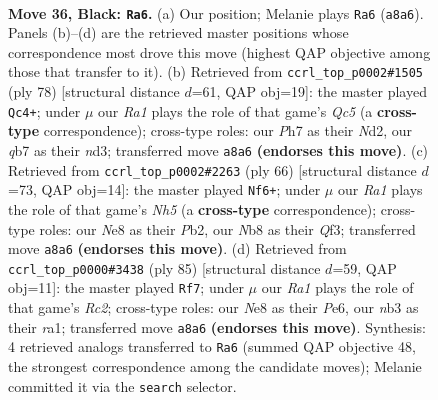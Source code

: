 \documentclass[11pt]{article}
\begin{document}
\clearpage

\begin{figure}[p]\centering
\begin{subfigure}{0.46\textwidth}\centering
\resizebox{\linewidth}{!}{%
\newchessgame
\chessboard[
  setfen={rn2nk2/1Q5p/7p/p1P2p1P/P4q2/1N6/6K1/RN6 b - - 5 36},
  showmover=false,
  pgfstyle=straightmove, color=movearrow, markmove={a8-a6}
]}
\caption{}
\end{subfigure}\hfill
\begin{subfigure}{0.46\textwidth}\centering
\resizebox{\linewidth}{!}{%
\newchessgame
\chessboard[
  setfen={3r1nk1/1q4p1/7p/2Q1p3/R3P3/3nP1PP/3N3N/6K1 w - - 0 40},
  showmover=false,
  pgfstyle=straightmove, color=movearrow, markmove={c5-c4}
]}
\caption{}
\end{subfigure}
\\[4pt]
\begin{subfigure}{0.46\textwidth}\centering
\resizebox{\linewidth}{!}{%
\newchessgame
\chessboard[
  setfen={2r3k1/4rp2/p2p2np/6qN/8/3P1Q1R/1P4PP/R6K w - - 4 34},
  showmover=false,
  pgfstyle=straightmove, color=movearrow, markmove={h5-f6}
]}
\caption{}
\end{subfigure}\hfill
\begin{subfigure}{0.46\textwidth}\centering
\resizebox{\linewidth}{!}{%
\newchessgame
\chessboard[
  setfen={8/2r3k1/4p1pp/Pqn1P3/6P1/4Q3/7P/R2N2K1 b - - 1 43},
  showmover=false,
  pgfstyle=straightmove, color=movearrow, markmove={c7-f7}
]}
\caption{}
\end{subfigure}
\caption{\textbf{Move 36, Black: \texttt{Ra6}.} (a) Our position; Melanie plays \texttt{Ra6} (\texttt{a8a6}). Panels (b)--(d) are the retrieved master positions whose correspondence most drove this move (highest QAP objective among those that transfer to it). (b) Retrieved from \texttt{ccrl\_top\_p0002\#1505} (ply 78) [structural distance $d$=61, QAP obj=19]: the master played \texttt{Qc4+}; under $\mu$ our \emph{Ra1} plays the role of that game's \emph{Qc5} (a \textbf{cross-type} correspondence); cross-type roles: our \emph{P}h7 as their \emph{N}d2, our \emph{q}b7 as their \emph{n}d3; transferred move \texttt{a8a6} \textbf{(endorses this move)}. (c) Retrieved from \texttt{ccrl\_top\_p0002\#2263} (ply 66) [structural distance $d$=73, QAP obj=14]: the master played \texttt{Nf6+}; under $\mu$ our \emph{Ra1} plays the role of that game's \emph{Nh5} (a \textbf{cross-type} correspondence); cross-type roles: our \emph{N}e8 as their \emph{P}b2, our \emph{N}b8 as their \emph{Q}f3; transferred move \texttt{a8a6} \textbf{(endorses this move)}. (d) Retrieved from \texttt{ccrl\_top\_p0000\#3438} (ply 85) [structural distance $d$=59, QAP obj=11]: the master played \texttt{Rf7}; under $\mu$ our \emph{Ra1} plays the role of that game's \emph{Rc2}; cross-type roles: our \emph{N}e8 as their \emph{P}e6, our \emph{n}b3 as their \emph{r}a1; transferred move \texttt{a8a6} \textbf{(endorses this move)}. Synthesis: 4 retrieved analogs transferred to \texttt{Ra6} (summed QAP objective 48, the strongest correspondence among the candidate moves); Melanie committed it via the \texttt{search} selector.}
\label{fig:thought-m71}
\end{figure}
\end{document}
